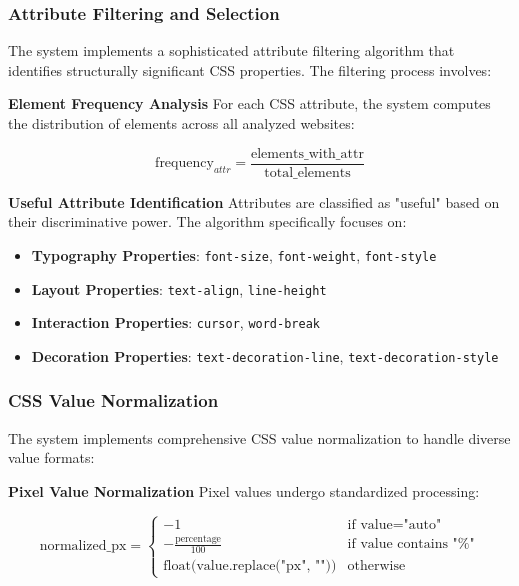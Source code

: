 \subsubsection{Attribute Filtering and Selection}
The system implements a sophisticated attribute filtering algorithm that identifies structurally significant CSS properties. The filtering process involves:

\textbf{Element Frequency Analysis}
For each CSS attribute, the system computes the distribution of elements across all analyzed websites:

\begin{equation}
\text{frequency}_{attr} = \frac{\text{elements\_with\_attr}}{\text{total\_elements}}
\end{equation}

\textbf{Useful Attribute Identification}
Attributes are classified as "useful" based on their discriminative power. The algorithm specifically focuses on:

\begin{itemize}
    \item \textbf{Typography Properties}: \texttt{font-size}, \texttt{font-weight}, \texttt{font-style}
    \item \textbf{Layout Properties}: \texttt{text-align}, \texttt{line-height}
    \item \textbf{Interaction Properties}: \texttt{cursor}, \texttt{word-break}
    \item \textbf{Decoration Properties}: \texttt{text-decoration-line}, \texttt{text-decoration-style}
\end{itemize}

\subsubsection{CSS Value Normalization}
The system implements comprehensive CSS value normalization to handle diverse value formats:

\textbf{Pixel Value Normalization}
Pixel values undergo standardized processing:

\begin{equation}
\text{normalized\_px} = \begin{cases}
-1 & \text{if value} = \text{"auto"} \\
-\frac{\text{percentage}}{100} & \text{if value contains "\%"} \\
\text{float(value.replace("px", ""))} & \text{otherwise}
\end{cases}
\end{equation}

